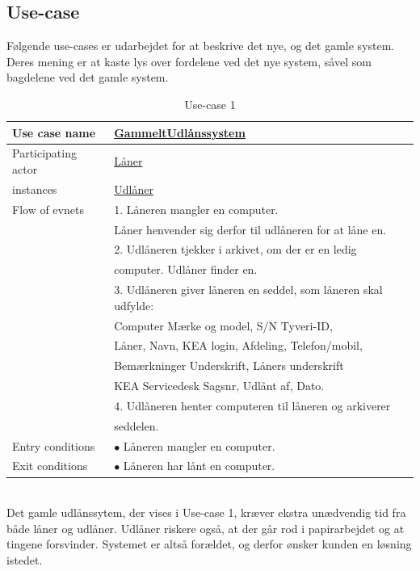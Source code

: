 \documentclass[a4paper]{article}
\begin{document}
\subsection{Use-case}
Følgende use-cases er udarbejdet for at beskrive det nye, og det gamle system. Deres mening er at kaste lys over fordelene ved det nye system, såvel som bagdelene ved det gamle system. \\
\begin{table}[h]
\caption{Use-case 1}
\begin{tabular}{ll}
Use case name                 & \underline{GammeltUdlånssystem} \\ \hline
Participating actor           & \underline{Låner} \\
instances                     & \underline{Udlåner} \\ \hline
Flow of evnets                & 1. Låneren mangler en computer.\\& Låner henvender sig derfor til udlåneren for at låne en.
\\& 2. Udlåneren tjekker i arkivet, om der er en ledig \\& computer. Udlåner finder en.
\\& 3. Udlåneren giver låneren en seddel, som låneren skal udfylde: \\& Computer Mærke og model, S/N Tyveri-ID, \\& Låner, Navn, KEA login, Afdeling, Telefon/mobil, \\& Bemærkninger Underskrift, Låners underskrift \\& KEA Servicedesk Sagsnr, Udlånt af, Dato.
\\& 4. Udlåneren henter computeren til låneren og arkiverer
\\& seddelen.\\ \hline
Entry conditions & $\bullet$ Låneren mangler en computer. \\ \hline
Exit conditions  & $\bullet$ Låneren har lånt en computer. 
\end{tabular}
\end{table} \\
Det gamle udlånssytem, der vises i Use-case 1, kræver ekstra unædvendig tid fra både låner og udlåner. Udlåner riskere også, at der går rod i papirarbejdet og at tingene forsvinder. Systemet er altså forældet, og derfor ønsker kunden en løsning istedet. \\
\end{document}
